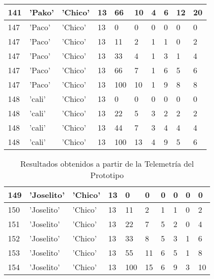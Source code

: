 \begin{table}[H]
\begin{center}
\begin{tabular}{ @{} | m{2em} | m{4em} | m{3em} | m{2em} | m{4em} | m{4em} | m{4em} | m{3em} | m{3em} | m{4em} |  }
  \hline
  141  & 'Pako' & 'Chico' &13 &66 &10 &4 &6 &12 &20  \\
  \hline
  147  & 'Paco' & 'Chico' &13 &0 &0 &0 &0 &0 &0  \\
  \hline
  147  & 'Paco' & 'Chico' &13 &11 &2 &1 &1 &0 &2  \\
  \hline
  147  & 'Paco' & 'Chico' &13 &33 &4 &1 &3 &1 &4  \\
  \hline
  147  & 'Paco' & 'Chico' &13 &66 &7 &1 &6 &5 &6  \\
  \hline
  147  & 'Paco' & 'Chico' &13 &100 &10 &1 &9 &8 &8  \\
  \hline
  148  & 'cali' & 'Chico' &13 &0 &0 &0 &0 &0 &0  \\
  \hline
  148  & 'cali' & 'Chico' &13 &22 &5 &3 &2 &2 &2  \\
  \hline
  148  & 'cali' & 'Chico' &13 &44 &7 &3 &4 &4 &4  \\
  \hline
  148  & 'cali' & 'Chico' &13 &100 &13 &4 &9 &5 &6  \\
  \hline
\end{tabular}
\centering
\end{center}
\end{table}  

\begin{table}[H]
  \begin{center}
  \hspace*{-40px}
  \begin{tabular}{ @{} | m{2em} | m{4em} | m{3em} | m{2em} | m{4em} | m{4em} | m{4em} | m{3em} | m{3em} | m{4em} |  } 
  \hline
  149  & 'Joselito' & 'Chico' &13 &0 &0 &0 &0 &0 &0  \\
  \hline
  150  & 'Joselito' & 'Chico' &13 &11 &2 &1 &1 &0 &2  \\
  \hline
  151  & 'Joselito' & 'Chico' &13 &22 &7 &5 &2 &0 &4  \\
  \hline
  152  & 'Joselito' & 'Chico' &13 &33 &8 &5 &3 &1 &6  \\
  \hline
  153  & 'Joselito' & 'Chico' &13 &55 &11 &6 &5 &1 &8  \\
  \hline
  154  & 'Joselito' & 'Chico' &13 &100 &15 &6 &9 &3 &10  \\
  \hline
\end{tabular}
\centering
\caption{Resultados obtenidos a partir de la Telemetría del Prototipo}
\label{fig:tablabbddpc}
\end{center}
\end{table}  


